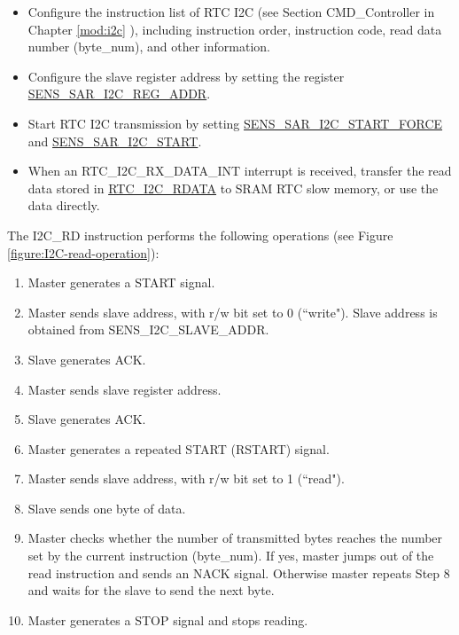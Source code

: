 \documentclass[main\_\_EN.tex]{subfiles}
\begin{document}
\begin{itemize}
    \item Configure the instruction list of RTC I2C (see Section CMD\_Controller in Chapter \ref{mod:i2c} \textit{}), including instruction order, instruction code, read data number (byte\_num), and other information.
    \item Configure the slave register address by setting the register \hyperref[fielddesc:SENSSARI2CREGADDR]{SENS\_SAR\_I2C\_REG\_ADDR}.
    \item Start RTC I2C transmission by setting \hyperref[fielddesc:SENSSARI2CSTARTFORCE]{SENS\_SAR\_I2C\_START\_FORCE} and \hyperref[fielddesc:SENSSARI2CSTART]{SENS\_SAR\_I2C\_START}.
    \item When an RTC\_I2C\_RX\_DATA\_INT interrupt is received, transfer the read data stored in \hyperref[fielddesc:RTCI2CI2CRDATA]{RTC\_I2C\_RDATA} to SRAM RTC slow memory, or use the data directly.
\end{itemize}


The I2C\_RD instruction performs the following operations (see Figure \ref{figure:I2C-read-operation}):

\begin{enumerate}
    \item Master generates a START signal.
    \item Master sends slave address, with r/w bit set to 0 (``write"). Slave address is obtained from  SENS\_I2C\_SLAVE\_ADDR.
    \item Slave generates ACK.
    \item Master sends slave register address.
    \item Slave generates ACK.
    \item Master generates a repeated START (RSTART) signal.
    \item Master sends slave address, with r/w bit set to 1 (``read").
    \item Slave sends one byte of data.
    \item Master checks whether the number of transmitted bytes reaches the number set by the current instruction (byte\_num). If yes, master jumps out of the read instruction and sends an NACK signal. Otherwise master repeats Step 8 and waits for the slave to send the next byte.
    \item Master generates a STOP signal and stops reading.
\end{enumerate}
\end{document}

